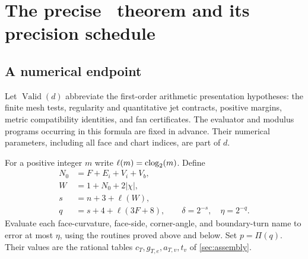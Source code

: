 \section{The precise \ipra\ theorem and its precision schedule}\label{sec:arithmetic}

\subsection{A numerical endpoint}

Let $\operatorname{Valid}(d)$ abbreviate the first-order arithmetic presentation hypotheses: the finite mesh tests, regularity and quantitative jet contracts, positive margins, metric compatibility identities, and fan certificates. The evaluator and modulus programs occurring in this formula are fixed in advance. Their numerical parameters, including all face and chart indices, are part of $d$.

For a positive integer $m$ write $\ell(m)=\operatorname{clog}_2(m)$. Define
\begin{equation}\label{eq:schedule}
\begin{aligned}
N_0&=F+E_i+V_i+V_b,\\
W&=1+N_0+2|\chi|,\\
s&=n+3+\ell(W),\\
q&=s+4+\ell(3F+8),\qquad \delta=2^{-s},\quad\eta=2^{-q}.
\end{aligned}
\end{equation}
Evaluate each face-curvature, face-side, corner-angle, and boundary-turn name to error at most $\eta$, using the routines proved above and below. Set $p=\Pi(q)$. Their values are the rational tables $c_T,g_{T,e},a_{T,v},t_v$ of \cref{sec:assembly}.

